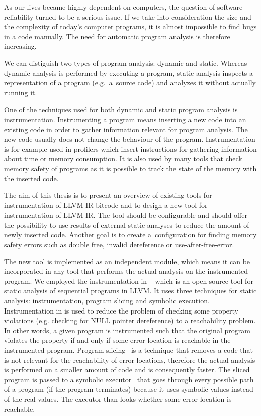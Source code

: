 As our lives became highly dependent on computers, the question of software
reliability turned to be a serious issue. If we take into consideration the
size and the complexity of today's computer programs, it is almost impossible
to find bugs in a code manually. The need for automatic program analysis is
therefore increasing.

We can distiguish two types of program analysis: dynamic and static. Whereas
dynamic analysis is performed by executing a program, static analysis
inspects a representation of a program (e.g.~a~source code) and analyzes it
without actually running it.

One of the techniques used for both dynamic and static program analysis is
instrumentation. Instrumenting a program means inserting a new code into an
existing code in order to gather information relevant for program analysis. The
new code usually does not change the behaviour of the program. Instrumentation
is for example used in profilers which insert instructions for gathering
information about time or memory consumption. It is also used by many tools
that check memory safety of programs as it is possible to track the state of
the memory with the inserted code.

The aim of this thesis is to present an overview of existing tools for
instrumentation of LLVM IR bitcode and to design a new tool for
instrumentation of LLVM IR. The tool should be configurable and should offer the
possibility to use results of external static analyses to reduce the amount of
newly inserted code. Another goal is to create a~configuration for finding
memory safety errors such as double free, invalid dereference or
use-after-free-error.

The new tool is implemented as an independent module, which means it can be
incorporated in any tool that performs the actual analysis on the instrumented
program. We employed the instrumentation in \symbiotic~\cite{Symbiotic} which
is an open-source tool for static analysis of sequential programs in LLVM. It
uses three techniques for static analysis: instrumentation, program slicing and
symbolic execution. Instrumentation in \symbiotic is used to reduce the problem
of checking some property violations (e.g. checking for NULL pointer
dereference) to a reachability problem. In other words, a given program is
instrumented such that the original program violates the property if and only
if some error location is reachable in the instrumented program. Program
slicing~\cite{weiser} is a technique that removes a code that is not
relevant for the reachability of error locations, therefore the actual
analysis is performed on a smaller amount of code and is consequently
faster. The sliced program is passed to a symbolic executor~\cite{King} that goes
through every possible path of a program (if the program terminates)
because it uses symbolic values instead of the real values. The executor than
looks whether some error location is reachable.


